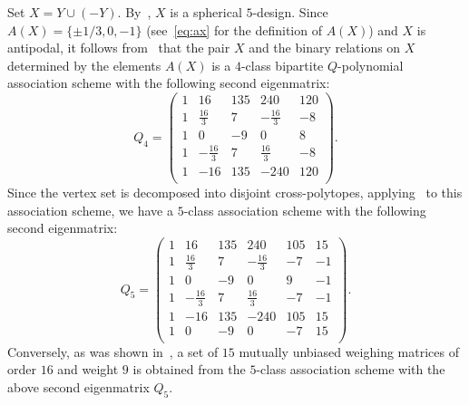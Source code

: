 \documentclass[12pt]{article}
\theoremstyle{remark}
\begin{document}
Set $X=Y\cup(-Y)$. By~\cite[Theorems~4.3 and~5.3]{DGS}, %
$X$ is a spherical $5$-design. 
Since $A(X)=\{\pm 1/3,0,-1\}$ (see~\eqref{eq:ax} for the definition of $A(X)$) and $X$ is antipodal, 
it follows from~\cite[Theorem~1.1]{BB09} that the pair $X$ and  the binary relations on $X$ determined by 
the elements $A(X)$ is a $4$-class bipartite $Q$-polynomial association scheme 
with the following second eigenmatrix: 
\[
Q_4=
\left(
\begin{array}{rrrrr}
 1 & 16 & 135 & 240 & 120 \\
 1 & \frac{16}{3} & 7 & -\frac{16}{3} & -8 \\
 1 & 0 & -9 & 0 & 8 \\
 1 & -\frac{16}{3} & 7 & \frac{16}{3} & -8 \\
 1 & -16 & 135 & -240 & 120 \\
\end{array}
\right). 
\]
Since the vertex set is decomposed into disjoint cross-polytopes, applying~\cite[Theorem~3.2]{S} to this association scheme, 
we have a $5$-class association scheme with the following second eigenmatrix:
\[
Q_5=
\left(
\begin{array}{rrrrrrr}
 1 & 16 & 135 & 240 & 105 & 15 \\
 1 & \frac{16}{3} & 7 & -\frac{16}{3} & -7 & -1 \\
 1 & 0 & -9 & 0 & 9 & -1 \\
 1 & -\frac{16}{3} & 7 & \frac{16}{3} & -7 & -1 \\
 1 & -16 & 135 & -240 & 105 & 15 \\
 1 & 0 & -9 & 0 & -7 & 15 \\
\end{array}
\right). 
\]
Conversely, as was shown in~\cite[Theorem~4.1]{S}, a set of $15$ mutually 
unbiased weighing matrices of order $16$ and weight $9$ is obtained from the $5$-class association scheme
with the above second eigenmatrix $Q_5$.

\end{document}
